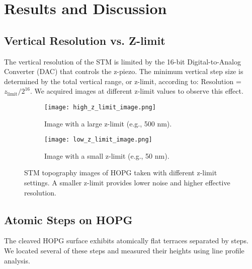 \documentclass[12pt,a4paper]{article}
\begin{document}
\section{Results and Discussion}

\subsection{Vertical Resolution vs. Z-limit}
The vertical resolution of the STM is limited by the 16-bit Digital-to-Analog Converter (DAC) that controls the z-piezo. The minimum vertical step size is determined by the total vertical range, or z-limit, according to: Resolution = $z_{\text{limit}} / 2^{16}$. We acquired images at different z-limit values to observe this effect.

\begin{figure}[H]
    \centering
    \begin{subfigure}[b]{0.48\linewidth}
        \centering
        \texttt{[image: high\_z\_limit\_image.png]}
        \caption{Image with a large z-limit (e.g., 500 nm).}
    \end{subfigure}\hfill
    \begin{subfigure}[b]{0.48\linewidth}
        \centering
        \texttt{[image: low\_z\_limit\_image.png]}
        \caption{Image with a small z-limit (e.g., 50 nm).}
    \end{subfigure}
    \caption{STM topography images of HOPG taken with different z-limit settings. A smaller z-limit provides lower noise and higher effective resolution.}
    \label{fig:z-limit}
\end{figure}


\subsection{Atomic Steps on HOPG}
The cleaved HOPG surface exhibits atomically flat terraces separated by steps. We located several of these steps and measured their heights using line profile analysis.
\end{document}
